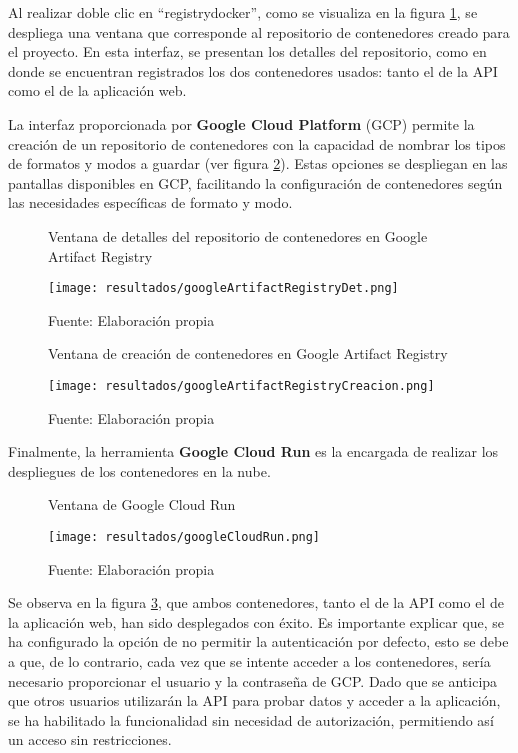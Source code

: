 Al realizar doble clic en ``registrydocker'', como se visualiza en la figura \ref{fig:figuraGoogleArtifactRegistryDet}, se despliega una ventana que corresponde al repositorio de contenedores creado para el proyecto. En esta interfaz, se presentan los detalles del repositorio, como en donde se encuentran registrados los dos contenedores usados: tanto el de la API como el de la aplicación web. \newline

La interfaz proporcionada por \textbf{Google Cloud Platform} (GCP) permite la creación de un repositorio de contenedores con la capacidad de nombrar los tipos de formatos y modos a guardar (ver figura \ref{fig:figuraGoogleArtifactRegistryCreacion}). Estas opciones se despliegan en las pantallas disponibles en GCP, facilitando la configuración de contenedores según las necesidades específicas de formato y modo.

\newpage

\begin{figure}[h]
	\centering
	\caption{Ventana de detalles del repositorio de contenedores en Google Artifact Registry}
	\texttt{[image: resultados/googleArtifactRegistryDet.png]}
	\caption*{\footnotesize Fuente: Elaboración propia}
	\label{fig:figuraGoogleArtifactRegistryDet}
\end{figure}

\newpage

\begin{figure}[h]
	\centering
	\caption{Ventana de creación de contenedores en Google Artifact Registry}
	\texttt{[image: resultados/googleArtifactRegistryCreacion.png]}
	\caption*{\footnotesize Fuente: Elaboración propia}
	\label{fig:figuraGoogleArtifactRegistryCreacion}
\end{figure}

\newpage

Finalmente, la herramienta \textbf{Google Cloud Run} es la encargada de realizar los despliegues de los contenedores en la nube.

\begin{figure}[h]
	\centering
	\caption{Ventana de Google Cloud Run}
	\texttt{[image: resultados/googleCloudRun.png]}
	\caption*{\footnotesize Fuente: Elaboración propia}
	\label{fig:figuraGoogleCloudRun}
\end{figure}

Se observa en la figura \ref{fig:figuraGoogleCloudRun}, que ambos contenedores, tanto el de la API como el de la aplicación web, han sido desplegados con éxito. Es importante explicar que, se ha configurado la opción de no permitir la autenticación por defecto, esto se debe a que, de lo contrario, cada vez que se intente acceder a los contenedores, sería necesario proporcionar el usuario y la contraseña de GCP. Dado que se anticipa que otros usuarios utilizarán la API para probar datos y acceder a la aplicación, se ha habilitado la funcionalidad sin necesidad de autorización, permitiendo así un acceso sin restricciones. \newline

